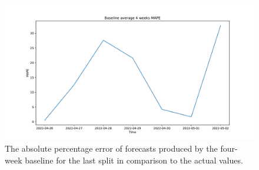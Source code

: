 \begin{figure}[H]
\centering
\includegraphics[width=1\textwidth]{images/baseline/baseline_average_4_weeks_daily_aggregated_mape}
\caption{The absolute percentage error of forecasts produced by the four-week baseline for the last split in comparison to the actual values.}
\label{fig:baseline4weeksdailyforecastsmape}
\end{figure}

